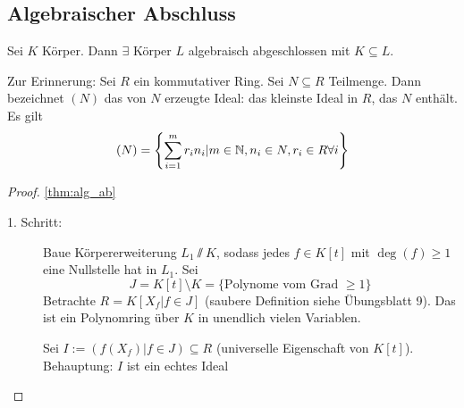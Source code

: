 \documentclass[12pt,a4paper]{scrartcl}
\begin{document}
\subsection{Algebraischer Abschluss}
\begin{satz}\label{thm:alg_ab}
	Sei $K$ Körper. Dann $\exists$ Körper $L$ algebraisch abgeschlossen mit $K\subseteq L$.
\end{satz}

Zur Erinnerung: Sei $R$ ein kommutativer Ring. Sei $N\subseteq R$ Teilmenge. Dann bezeichnet $(N)$ das von $N$ erzeugte Ideal: das kleinste Ideal in $R$, das $N$ enthält. Es gilt $$(N) = \left\{\sum_{i = 1}^mr_in_i|m\in\mathbb N, n_i\in N, r_i\in R \forall i\right\}$$

\begin{proof}\ref{thm:alg_ab}
	\leavevmode
	\begin{description}
		\item[1. Schritt:] Baue Körpererweiterung $L_1\sslash K$, sodass jedes $f\in K[t]$ mit $\deg(f)\geq 1$ eine Nullstelle hat in $L_1$. Sei 
		$$J = K[t]\setminus K = \{\text{Polynome vom Grad }\geq 1\}$$
		Betrachte $R = K[X_f|f\in J]$ (saubere Definition siehe Übungsblatt 9).  %
		Das ist ein Polynomring über $K$ in unendlich vielen Variablen.
		
		Sei $I := (f(X_f)|f\in J)\subseteq R$ (universelle Eigenschaft von $K[t]$). Behauptung: $I$ ist ein echtes Ideal
	\end{description}
	
\end{proof}
	
	


\end{document}
